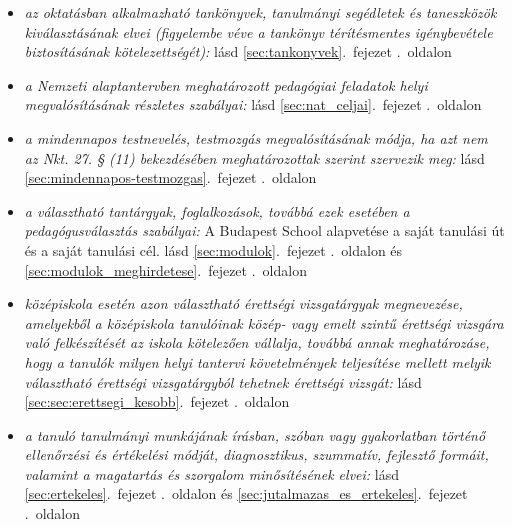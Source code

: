 \begin{itemize}
\item \emph{az oktatásban alkalmazható tankönyvek, tanulmányi segédletek és taneszközök kiválasztásának elvei (figyelembe véve a tankönyv térítésmentes igénybevétele biztosításának kötelezettségét): }    
       lásd        \ref{sec:tankonyvek}.~fejezet .~oldalon
              
\item \emph{a Nemzeti alaptantervben meghatározott pedagógiai feladatok helyi megvalósításának részletes szabályai: }    
       lásd        \ref{sec:nat_celjai}.~fejezet .~oldalon
              
\item \emph{a mindennapos testnevelés, testmozgás megvalósításának módja, ha azt nem az Nkt. 27. § (11) bekezdésében meghatározottak szerint szervezik meg: }    
       lásd        \ref{sec:mindennapos-testmozgas}.~fejezet .~oldalon
              
\item \emph{a választható tantárgyak, foglalkozások, továbbá ezek esetében a pedagógusválasztás szabályai: }   A Budapest School alapvetése a saját tanulási út és a saját tanulási cél. 
       lásd        \ref{sec:modulok}.~fejezet .~oldalon és 
              \ref{sec:modulok_meghirdetese}.~fejezet .~oldalon
              
\item \emph{középiskola esetén azon választható érettségi vizsgatárgyak megnevezése, amelyekből a középiskola tanulóinak közép- vagy emelt szintű érettségi vizsgára való felkészítését az iskola kötelezően vállalja, továbbá annak meghatározáse, hogy a tanulók milyen helyi tantervi követelmények teljesítése mellett melyik választható érettségi vizsgatárgyból tehetnek érettségi vizsgát: }    
       lásd        \ref{sec:sec:erettsegi_kesobb}.~fejezet .~oldalon
              
\item \emph{a tanuló tanulmányi munkájának írásban, szóban vagy gyakorlatban történő ellenőrzési és értékelési módját, diagnosztikus, szummatív, fejlesztő formáit, valamint a magatartás és szorgalom minősítésének elvei: }    
       lásd        \ref{sec:ertekeles}.~fejezet .~oldalon és 
              \ref{sec:jutalmazas_es_ertekeles}.~fejezet .~oldalon
              

\end{itemize}
